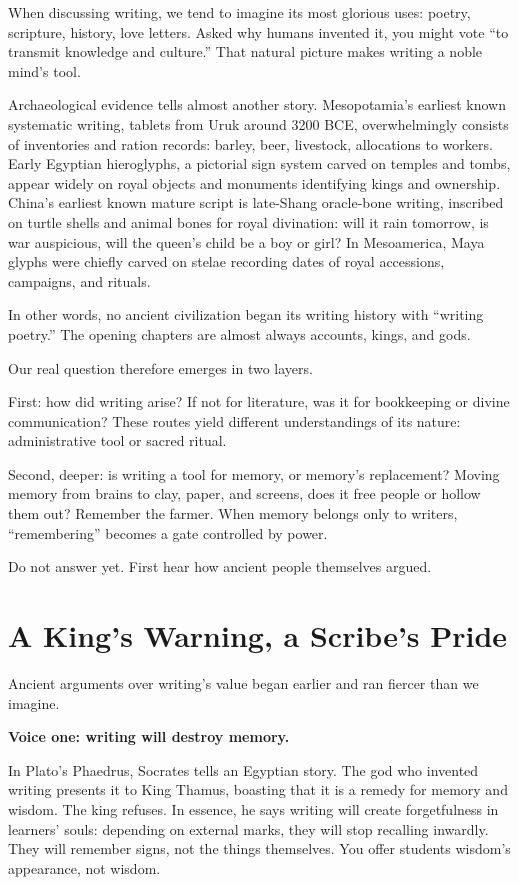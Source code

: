When discussing writing, we tend to imagine its most glorious uses: poetry, scripture, history, love letters. Asked why humans invented it, you might vote ``to transmit knowledge and culture.'' That natural picture makes writing a noble mind's tool.

Archaeological evidence tells almost another story. Mesopotamia's earliest known systematic writing, tablets from Uruk around 3200 BCE, overwhelmingly consists of inventories and ration records: barley, beer, livestock, allocations to workers. Early Egyptian hieroglyphs, a pictorial sign system carved on temples and tombs, appear widely on royal objects and monuments identifying kings and ownership. China's earliest known mature script is late-Shang oracle-bone writing, inscribed on turtle shells and animal bones for royal divination: will it rain tomorrow, is war auspicious, will the queen's child be a boy or girl? In Mesoamerica, Maya glyphs were chiefly carved on stelae recording dates of royal accessions, campaigns, and rituals.

In other words, no ancient civilization began its writing history with ``writing poetry.'' The opening chapters are almost always accounts, kings, and gods.

Our real question therefore emerges in two layers.

First: how did writing arise? If not for literature, was it for bookkeeping or divine communication? These routes yield different understandings of its nature: administrative tool or sacred ritual.

Second, deeper: is writing a tool for memory, or memory's replacement? Moving memory from brains to clay, paper, and screens, does it free people or hollow them out? Remember the farmer. When memory belongs only to writers, ``remembering'' becomes a gate controlled by power.

Do not answer yet. First hear how ancient people themselves argued.

\section{A King's Warning, a Scribe's Pride}
Ancient arguments over writing's value began earlier and ran fiercer than we imagine.

\textbf{Voice one: writing will destroy memory.}

In Plato's Phaedrus, Socrates tells an Egyptian story. The god who invented writing presents it to King Thamus, boasting that it is a remedy for memory and wisdom. The king refuses. In essence, he says writing will create forgetfulness in learners' souls: depending on external marks, they will stop recalling inwardly. They will remember signs, not the things themselves. You offer students wisdom's appearance, not wisdom.


